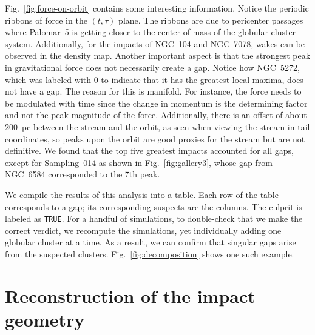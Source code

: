 \documentclass{aa}
\begin{document}
\begin{appendix}
    Fig.~\ref{fig:force-on-orbit} contains some interesting information. Notice the periodic ribbons of force in the $(t,\tau)$ plane. The ribbons are due to pericenter passages where Palomar~5 is getting closer to the center of mass of the globular cluster system. Additionally, for the impacts of NGC~104 and NGC~7078, wakes can be observed in the density map. Another important aspect is that the strongest peak in gravitational force does not necessarily create a gap. Notice how NGC~5272, which was labeled with 0 to indicate that it has the greatest local maxima, does not have a gap. The reason for this is manifold. For instance, the force needs to be modulated with time since the change in momentum is the determining factor and not the peak magnitude of the force.  Additionally, there is an offset of about 200~pc between the stream and the orbit, as seen when viewing the stream in tail coordinates, so peaks upon the orbit are good proxies for the stream but are not definitive. We found that the top five greatest impacts accounted for all gaps, except for Sampling~014 as shown in Fig.~\ref{fig:gallery3}, whose gap from NGC~6584 corresponded to the 7th peak. 

    We compile the results of this analysis into a table. Each row of the table corresponds to a gap; its corresponding suspects are the columns. The culprit is labeled as \texttt{TRUE}. For a handful of simulations, to double-check that we make the correct verdict, we recompute the simulations, yet individually adding one globular cluster at a time. As a result, we can confirm that singular gaps arise from the suspected clusters. Fig.~\ref{fig:decomposition} shows one such example. 



    \section{Reconstruction of the impact geometry} \label{sec:reconstruction}


\end{appendix}
\end{document}
